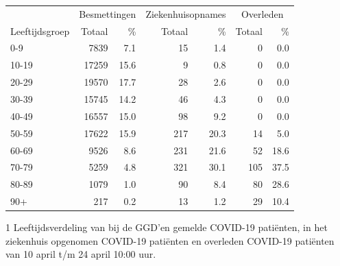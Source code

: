 \documentclass[
  english,
  man,floatsintext]{apa6}
\begin{document}
\begin{table}
\centering\begingroup\fontsize{11}{13}\selectfont

\begin{threeparttable}
\begin{tabular}{lrrrrrr}
\toprule
\multicolumn{1}{c}{ } & \multicolumn{2}{c}{Besmettingen} & \multicolumn{2}{c}{Ziekenhuisopnames} & \multicolumn{2}{c}{Overleden} \\
\cmidrule(l{3pt}r{3pt}){2-3} \cmidrule(l{3pt}r{3pt}){4-5} \cmidrule(l{3pt}r{3pt}){6-7}
Leeftijdsgroep & Totaal & \% & Totaal & \% & Totaal & \%\\
\midrule
0-9 & 7839 & 7.1 & 15 & 1.4 & 0 & 0.0\\
10-19 & 17259 & 15.6 & 9 & 0.8 & 0 & 0.0\\
20-29 & 19570 & 17.7 & 28 & 2.6 & 0 & 0.0\\
30-39 & 15745 & 14.2 & 46 & 4.3 & 0 & 0.0\\
40-49 & 16557 & 15.0 & 98 & 9.2 & 0 & 0.0\\
50-59 & 17622 & 15.9 & 217 & 20.3 & 14 & 5.0\\
60-69 & 9526 & 8.6 & 231 & 21.6 & 52 & 18.6\\
70-79 & 5259 & 4.8 & 321 & 30.1 & 105 & 37.5\\
80-89 & 1079 & 1.0 & 90 & 8.4 & 80 & 28.6\\
90+ & 217 & 0.2 & 13 & 1.2 & 29 & 10.4\\
\bottomrule
\end{tabular}
\begin{tablenotes}
\item[1] Leeftijdsverdeling van bij de GGD’en gemelde COVID-19 patiënten, in het ziekenhuis opgenomen COVID-19 patiënten en overleden COVID-19 patiënten van 10 april t/m 24 april 10:00 uur.
\end{tablenotes}
\end{threeparttable}
\endgroup{}
\end{table}

\newpage
\end{document}
